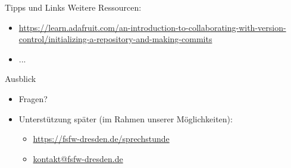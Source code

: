\documentclass{beamer}
\begin{document}

\begin{frame}[label=link10]{Tipps und Links}
Weitere Ressourcen:
\tiny
\begin{itemize}
 \item 
\url{https://learn.adafruit.com/an-introduction-to-collaborating-with-version-control/initializing-a-repository-and-making-commits}
\item ...
\end{itemize}

 
\end{frame}




\begin{frame}[label=uj]{Ausblick}
\begin{itemize}
 \item Fragen?\\[10mm]
   \pause
 \item Unterstützung später {\tiny (im Rahmen unserer Möglichkeiten)}:
   \begin{itemize}
   \item \url{https://fsfw-dresden.de/sprechstunde}
   \item \url{kontakt@fsfw-dresden.de}
   \end{itemize}
\end{itemize}



\end{frame}

\end{document}
